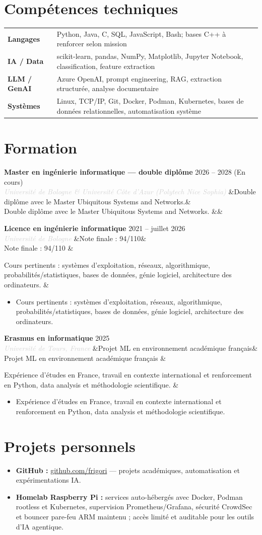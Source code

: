 \documentclass[a4paper,10pt]{article}
\newcommand{\entrylist}[5]{%
  \noindent\textbf{#1} \hfill \textcolor{accent}{#2}\\
  \textit{\textcolor{lightgray}{#3}}%
  \ifx&#4&\else\\[-0.05em]#4\fi
  \vspace{0.15em}
  \ifx&#5&\else\begin{itemize}#5\end{itemize}\fi
  \vspace{0.1em}
}
\newcommand{\skillrow}[2]{\textbf{#1} & #2 \\[0.15em]}
\begin{document}
\section{Compétences techniques}
\begin{tabularx}{\textwidth}{@{}>{\raggedright\arraybackslash}p{3.1cm}X@{}}
\skillrow{Langages}{Python, Java, C, SQL, JavaScript, Bash; bases C++ à renforcer selon mission}
\skillrow{IA / Data}{scikit-learn, pandas, NumPy, Matplotlib, Jupyter Notebook, classification, feature extraction}
\skillrow{LLM / GenAI}{Azure OpenAI, prompt engineering, RAG, extraction structurée, analyse documentaire}
\skillrow{Systèmes}{Linux, TCP/IP, Git, Docker, Podman, Kubernetes, bases de données relationnelles, automatisation système}
\end{tabularx}

\section{Formation}
\entrylist{Master en ingénierie informatique — double diplôme}{2026 -- 2028 (En cours)}{Université de Bologne \& Université Côte d'Azur (Polytech Nice Sophia)}{Double diplôme avec le Master Ubiquitous Systems and Networks.}{}

\entrylist{Licence en ingénierie informatique}{2021 -- juillet 2026}{Université de Bologne}{Note finale : 94/110}{
  \item Cours pertinents : systèmes d'exploitation, réseaux, algorithmique, probabilités/statistiques, bases de données, génie logiciel, architecture des ordinateurs.
}

\entrylist{Erasmus en informatique}{2025}{Université de Tours, France}{Projet ML en environnement académique français}{
  \item Expérience d'études en France, travail en contexte international et renforcement en Python, data analysis et méthodologie scientifique.
}

\section{Projets personnels}
\begin{itemize}
  \item \textbf{GitHub :} \href{https://github.com/frigori}{github.com/frigori} — projets académiques, automatisation et expérimentations IA.
  \item \textbf{Homelab Raspberry Pi :} services auto-hébergés avec Docker, Podman rootless et Kubernetes, supervision Prometheus/Grafana, sécurité CrowdSec et bouncer pare-feu ARM maintenu ; accès limité et auditable pour les outils d'IA agentique.
\end{itemize}
\end{document}
